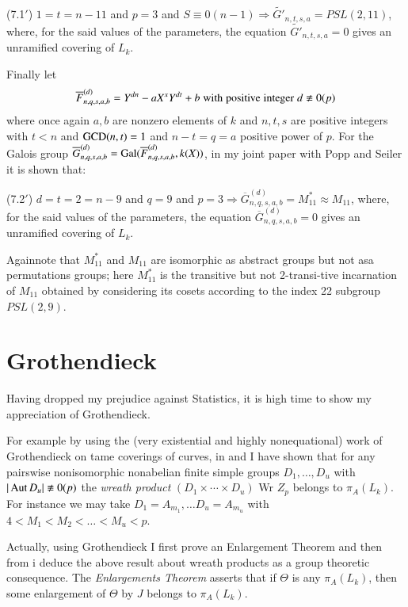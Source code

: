 (7.1$'$) $1=t=n-11$ and $p=3$ and $S\equiv 0(n-1) \Rightarrow \widetilde{G'}_{n,t,s,a} = PSL(2,11)$, where, for the said values of the parameters, the equation $ \widetilde{G'}_{n,t,s,a}=0$ gives an unramified covering of $L_{k}$.

Finally let
$$
\overline{F}^{(d)}_{n,q,s,a,b} = Y^{dn}-aX^{x}Y^{dt} + b\; {\rm with\; positive\; integer}\; d\nequiv 0(p)
$$ 
where once again $a,b$ are nonzero elements of $k$ and $n,t,s$ are positive integers with $t<n$ and $\operatorname{GCD}(n,t)=1$ and
$n-t=q=a$ positive power of $p$. For the Galois group $\overline{G}^{(d)}_{n,q,s,a,b} = \operatorname{Gal}(\overline{F}^{(d)}_{n,q,s,a,b}, k(X))$, in my joint paper \cite{chap1-key15} with Popp and Seiler it is shown that:

(7.2$'$) $d=t=2=n-9$ and $q=9$ and $p=3 \Rightarrow \overline{G}^{(d)}_{n,q,s,a,b} =M^{*}_{11}\approx M_{11}$, where, for the said values of the parameters, the equation  $\overline{G}^{(d)}_{n,q,s,a,b} = 0$ gives an unramified covering of $L_{k}$.

Again\pageoriginale note that $M^{*}_{11}$ and $M_{11}$ are isomorphic as abstract groups but not asa permutations groups; here $M^{*}_{11}$ is the transitive but not 2-transi-\break tive incarnation of $M_{11}$ obtained by considering its cosets according to the index 22 subgroup $PSL(2,9)$.

\section{Grothendieck}\label{chap1-sec8}

Having dropped my prejudice against Statistics, it is high time to show my appreciation of Grothendieck.

For example by using the (very existential and highly nonequational) work of Grothendieck \cite{chap1-key33} on tame coverings of curves, in \cite{chap1-key7} and \cite{chap1-key11} I have shown that for any pairswise nonisomorphic nonabelian finite simple groups $D_{1},\ldots, D_{u}$ with $|\Aut D_{u}| \nequiv 0(p)$ the \textit{wreath product} $(D_{1}\times\cdots\times D_{u})$ Wr $Z_{p}$ belongs to $\pi_{A}(L_{k})$. For instance we may take $D_{1}= A_{m_{1}}, \ldots D_{u} =A_{m_{u}}$ with $4 < M_{1} < M_{2} < \ldots < M_{u} < p$. 

Actually, using Grothendieck \cite{chap1-key33} I first prove an Enlargement Theorem and then from i deduce the above result about wreath products as a group theoretic consequence. The \textit{Enlargements Theorem} asserts that if $\Theta$ is any $\pi_{A}(L_{k})$, then some enlargement of $\Theta$ by $J$ belongs to $\pi_{A}(L_{k})$. 


